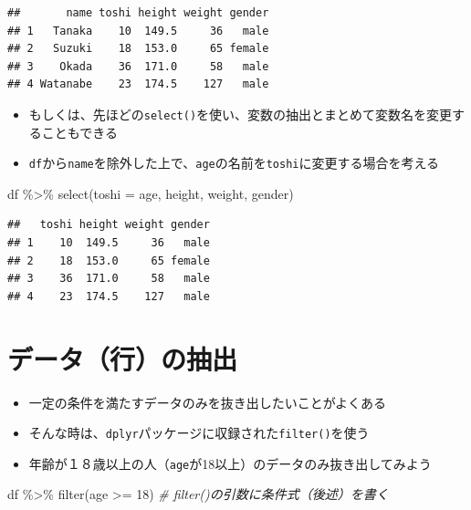 \documentclass[
]{book}
\newenvironment{Shaded}{\begin{snugshade}}{\end{snugshade}}
\newcommand{\AttributeTok}[1]{\textcolor[rgb]{0.77,0.63,0.00}{#1}}
\newcommand{\CommentTok}[1]{\textcolor[rgb]{0.56,0.35,0.01}{\textit{#1}}}
\newcommand{\DecValTok}[1]{\textcolor[rgb]{0.00,0.00,0.81}{#1}}
\newcommand{\FunctionTok}[1]{\textcolor[rgb]{0.00,0.00,0.00}{#1}}
\newcommand{\NormalTok}[1]{#1}
\newcommand{\SpecialCharTok}[1]{\textcolor[rgb]{0.00,0.00,0.00}{#1}}
\providecommand{\tightlist}{%
  \setlength{\itemsep}{0pt}\setlength{\parskip}{0pt}}
\begin{document}
\begin{verbatim}
##       name toshi height weight gender
## 1   Tanaka    10  149.5     36   male
## 2   Suzuki    18  153.0     65 female
## 3    Okada    36  171.0     58   male
## 4 Watanabe    23  174.5    127   male
\end{verbatim}

\begin{itemize}
\tightlist
\item
  もしくは、先ほどの\texttt{select()}を使い、変数の抽出とまとめて変数名を変更することもできる
\item
  \texttt{df}から\texttt{name}を除外した上で、\texttt{age}の名前を\texttt{toshi}に変更する場合を考える
\end{itemize}

\begin{Shaded}
\begin{Highlighting}[]
\NormalTok{df }\SpecialCharTok{\%\textgreater{}\%} 
  \FunctionTok{select}\NormalTok{(}\AttributeTok{toshi =}\NormalTok{ age, height, weight, gender)}
\end{Highlighting}
\end{Shaded}

\begin{verbatim}
##   toshi height weight gender
## 1    10  149.5     36   male
## 2    18  153.0     65 female
## 3    36  171.0     58   male
## 4    23  174.5    127   male
\end{verbatim}

\hypertarget{ux30c7ux30fcux30bfux884cux306eux62bdux51fa}{%
\section{データ（行）の抽出}\label{ux30c7ux30fcux30bfux884cux306eux62bdux51fa}}

\begin{itemize}
\tightlist
\item
  一定の条件を満たすデータのみを抜き出したいことがよくある
\item
  そんな時は、\texttt{dplyr}パッケージに収録された\texttt{filter()}を使う
\item
  年齢が１８歳以上の人（\texttt{age}が18以上）のデータのみ抜き出してみよう
\end{itemize}

\begin{Shaded}
\begin{Highlighting}[]
\NormalTok{df }\SpecialCharTok{\%\textgreater{}\%} 
  \FunctionTok{filter}\NormalTok{(age }\SpecialCharTok{\textgreater{}=} \DecValTok{18}\NormalTok{) }\CommentTok{\# filter()の引数に条件式（後述）を書く}
\end{Highlighting}
\end{Shaded}
\end{document}
